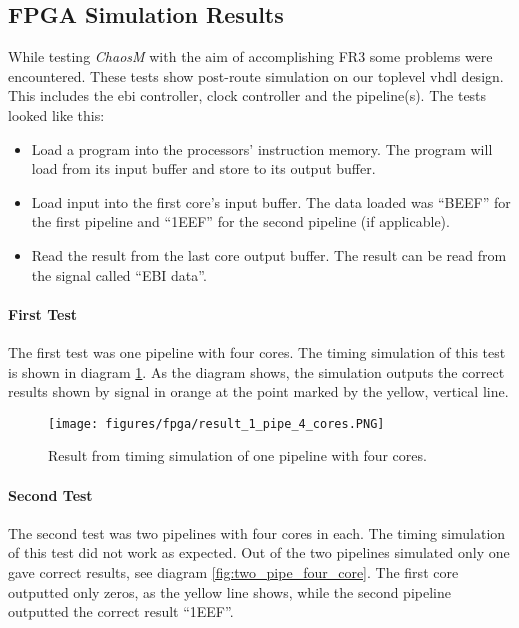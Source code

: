 
\subsection{FPGA Simulation Results}
While testing \textit{ChaosM} with the aim of accomplishing FR3 
some problems were encountered. These tests show post-route simulation on our 
toplevel vhdl design. This includes the ebi controller, clock controller and the pipeline(s). 
The tests looked like this:

\begin{itemize}
\item Load a program into the processors’ instruction memory. The program will load from its input buffer and store to its output buffer.\\
\item Load input into the first core’s input buffer. The data loaded was “BEEF” for the first pipeline and “1EEF” for the second pipeline (if applicable).\\
\item Read the result from the last core output buffer. The result can be read from the signal called “EBI data”.\\
\end{itemize}


\paragraph{First Test}
The first test was one pipeline with four cores. The timing simulation of this test is
 shown in diagram \ref{fig:one_pipe_four_core}. As the diagram shows, 
 the simulation outputs the correct results shown by signal in orange at the point 
 marked by the yellow, vertical line. 
 
 \begin{figure}[H]
    \centering
    \texttt{[image: figures/fpga/result\_1\_pipe\_4\_cores.PNG]}
    \caption{Result from timing simulation of one pipeline with four cores.}
    \label{fig:one_pipe_four_core}
\end{figure}

\paragraph{Second Test}
The second test was two pipelines with four cores in each. The timing simulation 
of this test did not work as expected. Out of the two pipelines simulated only one 
gave correct results, see diagram \ref{fig:two_pipe_four_core}. The first core 
outputted only zeros, as the yellow line shows,  while the second pipeline outputted the correct result “1EEF”. 

